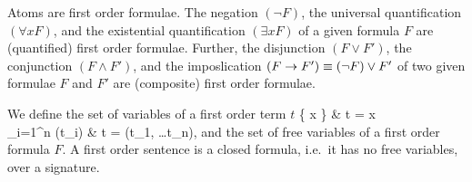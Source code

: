 
\begin{definition}[\FOF]\label{def:syntax:FOF}
	Atoms are {\myem first order formulae}. 
	The negation $(\lnot F)$, 
	the universal quantification $(\forall x F)$, 
	and the existential quantification $(\exists x F)$ 
	of a given formula $F$ are (quantified) first order formulae.
	Further, the disjunction $(F \lor F')$, 
	the conjunction $(F \land F') $, 
	and the imposlication $(F \rightarrow F') \equiv (\lnot F) \lor F'$ 
	of two given formulae $F$ and $F'$ 
	are (composite) first order formulae.
\end{definition}

\begin{definition}\label{def:term:vars}\label{def:fof:fvars}\label{def:fof:sentence}
	We define the set of variables of a first order term $t$
	 {
		\{ x \} &  t = x \in \mcV \\
		\bigcup_{i=1}^n \var(t_i) &   t = \mf(t_1, \ldots t_n), \mf \in \mcFfn
	}
and the set of {\myem free} variables of a first order formula $F$.
A first order {\myem sentence} is a closed formula, 
i.e.~it has no free variables, 
over a signature.
\end{definition}